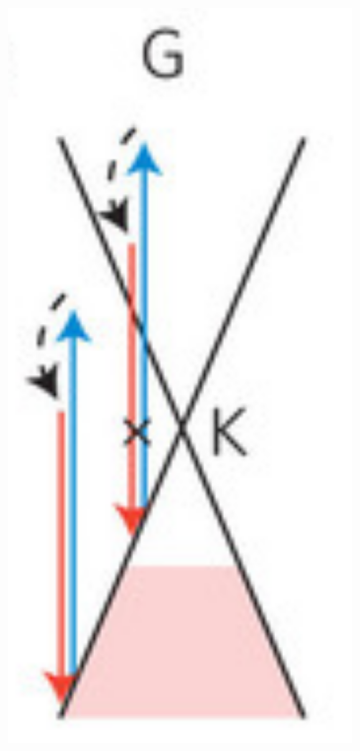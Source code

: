 \begin{figure}[!h]
  \centering
  \begin{subfigure}{0.2\textwidth}
    \includegraphics[width=\textwidth]{./images/g-mode.png}

\end{subfigure}
\end{figure}
